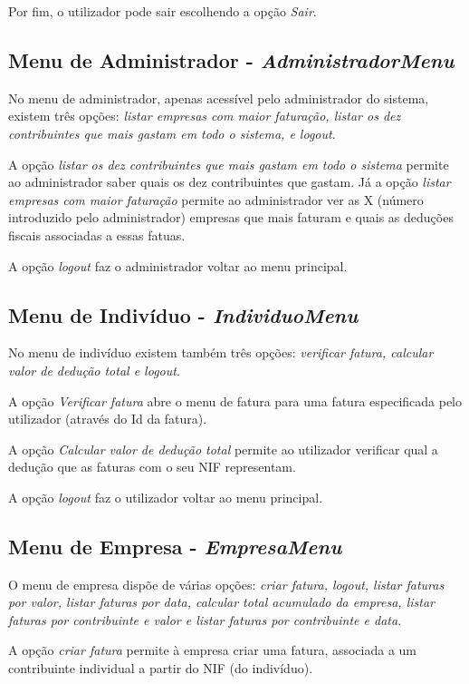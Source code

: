 \documentclass[12pt]{report}
\newcommand\tab[1][0.5cm]{\hspace*{#1}}
\begin{document}
Por fim, o utilizador pode sair escolhendo a opção \textit{Sair}.

\subsection{Menu de Administrador - \textit{AdministradorMenu}}
\tab No menu de administrador, apenas acessível pelo administrador do sistema, existem três opções: \textit{listar empresas com maior faturação, listar os dez contribuintes que mais gastam em todo o sistema, e logout}.

A opção \textit{listar os dez contribuintes que mais gastam em todo o sistema} permite ao administrador saber quais os dez contribuintes que gastam. Já a opção \textit{listar empresas com maior faturação} permite ao administrador ver as X (número introduzido pelo administrador) empresas que mais faturam e quais as deduções fiscais associadas a essas fatuas.

A opção \textit{logout} faz o administrador voltar ao menu principal.

\subsection{Menu de Indivíduo - \textit{IndividuoMenu}}
\tab No menu de indivíduo existem também três opções: \textit{verificar fatura, calcular valor de dedução total e logout}.

A opção \textit{Verificar fatura} abre o menu de fatura para uma fatura especificada pelo utilizador (através do Id da fatura).

A opção \textit{Calcular valor de dedução total} permite ao utilizador verificar qual a dedução que as faturas com o seu NIF representam.

A opção \textit{logout} faz o utilizador voltar ao menu principal.

\subsection{Menu de Empresa - \textit{EmpresaMenu}}
\tab O menu de empresa dispõe de várias opções: \textit{criar fatura, logout, listar faturas por valor, listar faturas por data, calcular total acumulado da empresa, listar faturas por contribuinte e valor e listar faturas por contribuinte e data}.

A opção \textit{criar fatura} permite à empresa criar uma fatura, associada a um contribuinte individual a partir do NIF (do indivíduo).
\end{document}
